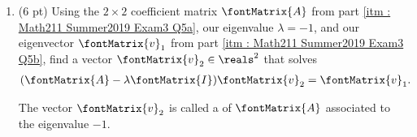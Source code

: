 


\begin{enumerate}[resume,label=(\alph*)]
\item\label{itm : Math211 Summer2019 Exam3 Q5c} (6 pt) Using the $2 \times 2$ coefficient matrix $\fontMatrix{A}$ from part \ref{itm : Math211 Summer2019 Exam3 Q5a}, our eigenvalue $\lambda = -1$, and our eigenvector $\fontMatrix{v}_{1}$ from part \ref{itm : Math211 Summer2019 Exam3 Q5b}, find a vector $\fontMatrix{v}_{2} \in \reals^{2}$ that solves
\begin{align}
(\fontMatrix{A} - \lambda \fontMatrix{I}) \fontMatrix{v}_{2}
=
\fontMatrix{v}_{1}.%
\label{eq : Math211 Summer2019 Exam3 Q5 Generalized Eigenvector}
\end{align}

The vector $\fontMatrix{v}_{2}$ is called a  of $\fontMatrix{A}$ associated to the eigenvalue $-1$.
\end{enumerate}


